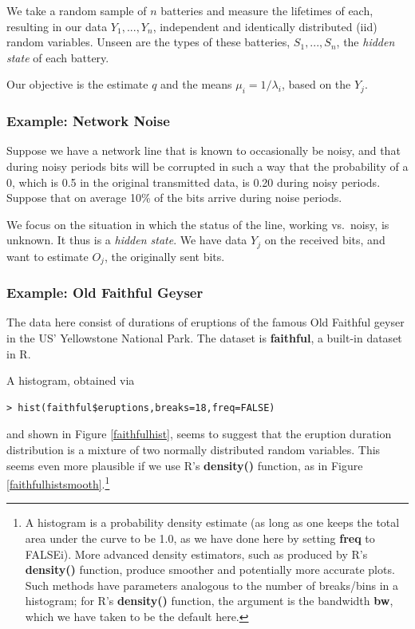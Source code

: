 \documentclass[11pt]{article}
\begin{document}
We take a random sample of $n$ batteries and measure the lifetimes of
each, resulting in our data $Y_1,...,Y_n$, independent and identically
distributed (iid) random variables.  Unseen are the types of these
batteries, $S_1,...,S_n$, the \textit{hidden state} of each battery.

Our objective is the estimate $q$ and the means $\mu_i = 1/\lambda_i$,
based on the $Y_j$.  

\subsubsection{Example:  Network Noise}

Suppose we have a network line that is known to occasionally be
noisy, and that during noisy periods bits will be corrupted in such
a way that the probability of a 0, which is 0.5 in the original
transmitted data, is 0.20 during noisy periods.  Suppose that on average
10\% of the bits arrive during noise periods.

We focus on the situation in which the status of the line, working vs.\
noisy, is unknown.  It thus is a \textit{hidden state}.  We have data
$Y_j$ on the received bits, and want to estimate $O_j$, the originally
sent bits.

\subsubsection{Example:  Old Faithful Geyser}

The data here consist of durations of eruptions of the famous
Old Faithful geyser in the US' Yellowstone National Park.  The dataset
is \textbf{faithful}, a built-in dataset in R.

A histogram, obtained via 

\begin{lstlisting}
> hist(faithful$eruptions,breaks=18,freq=FALSE)
\end{lstlisting}

and shown in Figure \ref{faithfulhist}, seems to suggest that the
eruption duration distribution is a mixture of two normally distributed random
variables.  This seems even more plausible if we use R's 
\textbf{density()} function, as in Figure
\ref{faithfulhistsmooth}.\footnote{A histogram is a probability density
estimate (as long as one keeps the total area under the curve to be 1.0,
as we have done here by setting \textbf{freq} to FALSEi).  More advanced
density estimators, such as produced by R's \textbf{density()} function,
produce smoother and potentially more accurate plots.  Such methods have
parameters analogous to the number of breaks/bins in a histogram; for
R's \textbf{density()} function, the argument is the bandwidth
\textbf{bw}, which we have taken to be the default here.}
\end{document}
